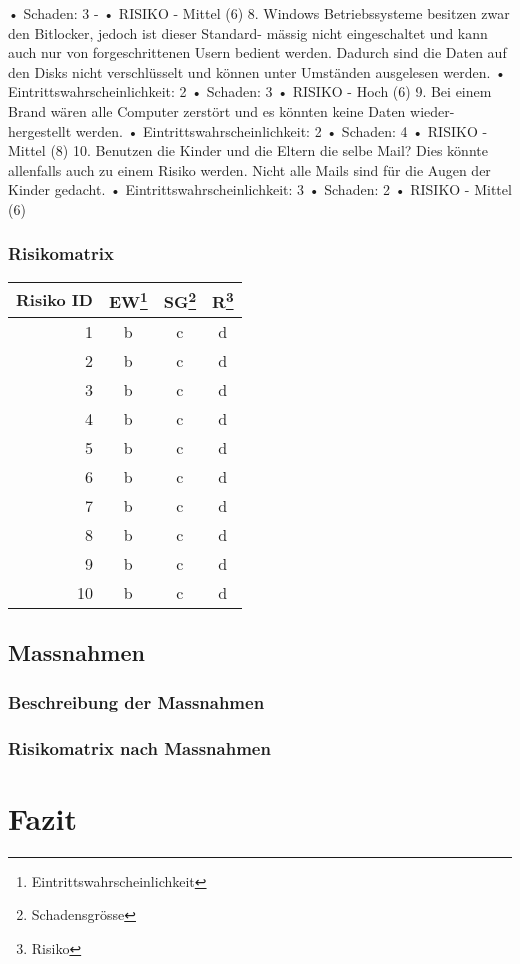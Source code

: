 \documentclass{article}
\newcommand*{\thead}[1]{\multicolumn{1}{c}{\bfseries #1}}
\begin{document}
• Schaden: 3 -
• RISIKO - Mittel (6)
8. Windows Betriebssysteme besitzen zwar den Bitlocker, jedoch ist dieser Standard-
mässig nicht eingeschaltet und kann auch nur von forgeschrittenen Usern bedient
werden. Dadurch sind die Daten auf den Disks nicht verschlüsselt und können unter
Umständen ausgelesen werden.
• Eintrittswahrscheinlichkeit: 2
• Schaden: 3
• RISIKO - Hoch (6)
9. Bei einem Brand wären alle Computer zerstört und es könnten keine Daten wieder-
hergestellt werden.
• Eintrittswahrscheinlichkeit: 2
• Schaden: 4
• RISIKO - Mittel (8)
10. Benutzen die Kinder und die Eltern die selbe Mail? Dies könnte allenfalls auch zu
einem Risiko werden. Nicht alle Mails sind für die Augen der Kinder gedacht.
• Eintrittswahrscheinlichkeit: 3
• Schaden: 2
• RISIKO - Mittel (6)


\subsubsection{Risikomatrix}

\begin{tabular}{|r|c|c|c|}
	\hline
	\thead{Risiko ID} & \thead{EW\footnote{Eintrittswahrscheinlichkeit}} & \thead{SG\footnote{Schadensgrösse}} & \thead{R\footnote{Risiko}} \\ \hline
	1 &  \cellcolor{blue!25}b & c & d \\ \hline
	2 & b & c & d \\ \hline
	3 &  \cellcolor{blue!25}b & c & d \\ \hline
	4 & b & c & d \\ \hline
	5 &  \cellcolor{blue!25}b & c & d \\ \hline
	6 & b & c & d \\ \hline
	7 &  \cellcolor{blue!25}b & c & d \\ \hline
	8 & b & c & d \\ \hline
	9 &  \cellcolor{blue!25}b & c & d \\ \hline
	10 & b & c & d \\ \hline
\end{tabular}




\subsection{Massnahmen}

\subsubsection{Beschreibung der Massnahmen}

\subsubsection{Risikomatrix nach Massnahmen}



\section{Fazit}
\end{document}
